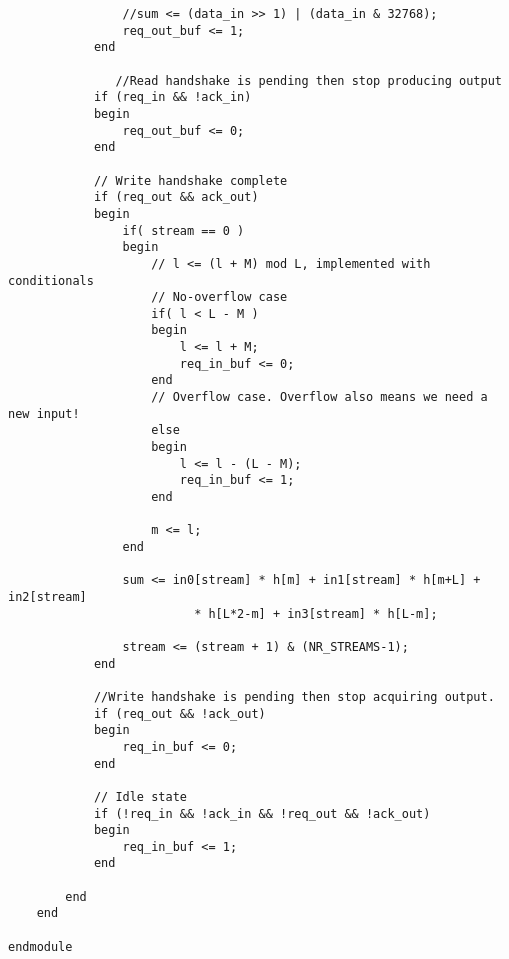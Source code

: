 \begin{verbatim}
                //sum <= (data_in >> 1) | (data_in & 32768);
                req_out_buf <= 1;
            end

               //Read handshake is pending then stop producing output
            if (req_in && !ack_in)
            begin
                req_out_buf <= 0;
            end

            // Write handshake complete
            if (req_out && ack_out)
            begin
                if( stream == 0 )
                begin
                    // l <= (l + M) mod L, implemented with conditionals
                    // No-overflow case
                    if( l < L - M )
                    begin
                        l <= l + M;
                        req_in_buf <= 0;
                    end
                    // Overflow case. Overflow also means we need a new input!
                    else
                    begin
                        l <= l - (L - M);
                        req_in_buf <= 1;
                    end

                    m <= l;
                end

                sum <= in0[stream] * h[m] + in1[stream] * h[m+L] + in2[stream]
                          * h[L*2-m] + in3[stream] * h[L-m];

                stream <= (stream + 1) & (NR_STREAMS-1);
            end

            //Write handshake is pending then stop acquiring output.
            if (req_out && !ack_out)
            begin
                req_in_buf <= 0;
            end

            // Idle state
            if (!req_in && !ack_in && !req_out && !ack_out)
            begin
                req_in_buf <= 1;
            end

        end
    end

endmodule

\end{verbatim}
